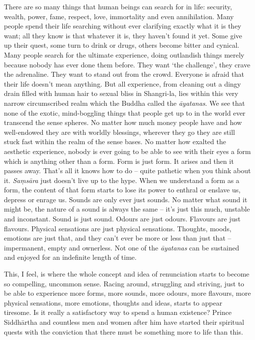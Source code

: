 There are so many things that human beings can search for in life: 
security, wealth, power, fame, respect, love, immortality and even
annihilation. Many people spend their life searching without ever
clarifying exactly what it is they want; all they know is that whatever
it is, they haven't found it yet. Some give up their quest, some turn to
drink or drugs, others become bitter and cynical. Many people search for
the ultimate experience, doing outlandish things merely because nobody
has ever done them before. They want `the challenge', they crave the
adrenaline. They want to stand out from the crowd. Everyone is afraid
that their life doesn't mean anything. But all experience, from cleaning
out a dingy drain filled with human hair to sexual bliss in Shangri-la, 
lies within this very narrow circumscribed realm which the Buddha called
the \emph{āyatanas}. We see that none of the exotic, mind-boggling
things that people get up to in the world ever transcend the sense
spheres. No matter how much money people have and how well-endowed they
are with worldly blessings, wherever they go they are still stuck fast
within the realm of the sense bases. No matter how exalted the aesthetic
experience, nobody is ever going to be able to see with their eyes a
form which is anything other than a form. Form is just form. It arises
and then it passes away. That's all it knows how to do -- quite pathetic
when you think about it. \emph{Saṃsāra} just doesn't live up to the
hype. When we understand a form as a form, the content of that form
starts to lose its power to enthral or enslave us, depress or enrage us. 
Sounds are only ever just sounds. No matter what sound it might be, the
nature of a sound is always the same -- it's just this much, unstable
and inconstant. Sound is just sound. Odours are just odours. Flavours
are just flavours. Physical sensations are just physical sensations. 
Thoughts, moods, emotions are just that, and they can't ever be more or
less than just that -- impermanent, empty and ownerless. Not one of the
\emph{āyatanas} can be sustained and enjoyed for an indefinite length of
time. 

This, I feel, is where the whole concept and idea of renunciation starts
to become so compelling, uncommon sense. Racing around, struggling and
striving, just to be able to experience more forms, more sounds, more
odours, more flavours, more physical sensations, more emotions, thoughts
and ideas, starts to appear tiresome. Is it really a satisfactory way to
spend a human existence? Prince Siddhārtha and countless men and women
after him have started their spiritual quests with the conviction that
there must be something more to life than this. 

